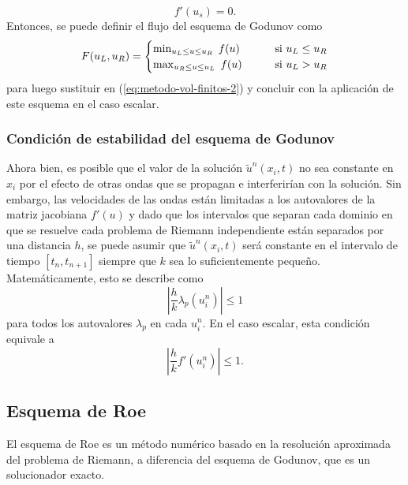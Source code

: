 \begin{equation}
	f'(u_s) = 0.
\end{equation}
Entonces, se puede definir el flujo del esquema de Godunov como
\begin{equation}
	F(u_L,u_R) = 
	\begin{cases}
		\min_{u_L \leq u \leq u_R} \hspace{1mm} f(u) & \hspace{7mm} \text{si }u_L \leq u_R \\
		\max_{u_R \leq u \leq u_L} \hspace{1mm} f(u) & \hspace{7mm} \text{si }u_L > u_R
	\end{cases}
\end{equation}
para luego sustituir en (\ref{eq:metodo-vol-finitos-2}) y concluir con la aplicación de este esquema en el caso escalar.
\subsubsection{Condición de estabilidad del esquema de Godunov}
Ahora bien, es posible que el valor de la solución $\tilde{u}^{n}(x_{i},t)$ no sea constante en $x_i$ por el efecto de otras ondas que se propagan e interferirían con la solución. Sin embargo, las velocidades de las ondas están limitadas a los autovalores de la matriz jacobiana $f'(u)$ y dado que los intervalos que separan cada dominio en que se resuelve cada problema de Riemann independiente están separados por una distancia $h$, se puede asumir que $\tilde{u}^{n}(x_{i},t)$ será constante en el intervalo de tiempo $[t_n, t_{n+1}]$ siempre que $k$ sea lo suficientemente pequeño. Matemáticamente, esto se describe como
\begin{equation}
	\left|\frac{h}{k} \lambda_{p}(u_i^{n})\right| \leq 1
\end{equation}
para todos los autovalores $\lambda_{p}$ en cada $u_i^{n}$. En el caso escalar, esta condición equivale a
\begin{equation}
	\left|\frac{h}{k} f'(u_i^{n})\right| \leq 1.
\end{equation}

\subsection{Esquema de Roe}
El esquema de Roe es un método numérico basado en la resolución aproximada del problema de Riemann, a diferencia del esquema de Godunov, que es un solucionador exacto.


